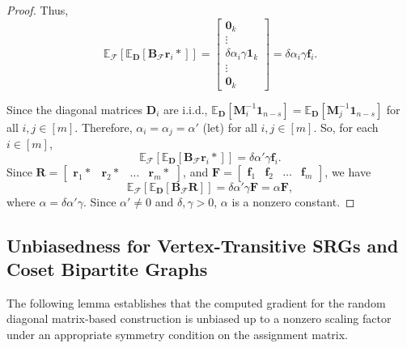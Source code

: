 \documentclass[journal,draftcls,onecolumn]{IEEEtran}
\theoremstyle{mystyle}
\newcommand{\bfD}{\mathbf{D}}
\newcommand{\bfF}{\mathbf{F}}
\newcommand{\bfA}{\mathbf{A}}
\newcommand{\bfR}{\mathbf{R}}
\newcommand{\cF}{\mathcal{F}}
\newcommand{\sifat}[1]{\marginpar{+}{\bf Sifat's remark}: {\em #1}}
\begin{document}
\begin{proof}
Thus,
\[ 
\mathbb{E}_{\mathcal{F}}[\mathbb{E}_{\mathbf{D}}\left[\mathbf{B}_{\mathcal{F}}\mathbf{r}_i*\right]] = \begin{bmatrix} \mathbf{0}_k\\ \vdots \\  \delta \alpha_i \gamma \mathbf{1}_{k} \\ \vdots\\ \mathbf{0}_k \end{bmatrix} =  \delta \alpha_i \gamma  \mathbf{f}_i
.\]

Since the diagonal matrices $\mathbf{D}_i$ are i.i.d., $\mathbb{E}_{\bfD}[\mathbf{M}_i^{-1} \mathbf{1}_{n-s}] = \mathbb{E}_{\bfD}[\mathbf{M}_j^{-1} \mathbf{1}_{n-s}]$ for all $i,j \in [m]$. Therefore, $\alpha_i = \alpha_ j = \alpha'$ (let) for all $i ,j \in [m]$. So, for each $i \in [m]$,  
\[ 
\mathbb{E}_{\mathcal{F}}[\mathbb{E}_{\mathbf{D}}\left[\mathbf{B}_{\mathcal{F}}\mathbf{r}_i*\right]]=  \delta \alpha' \gamma \mathbf{f}_i
.\]
Since $\bfR = \begin{bmatrix}\mathbf{r}_1* & \mathbf{r}_2* & \dots & \mathbf{r}_m* \end{bmatrix}$, and $\bfF = \begin{bmatrix}\mathbf{f}_1 & \mathbf{f}_2 & \dots & \mathbf{f}_m \end{bmatrix}$, we have 
\[ \mathbb{E}_{\mathcal{F}}[\mathbb{E}_{\mathbf{D}}\left[\mathbf{B}_{\mathcal{F}}\mathbf{R}\right]] = \delta \alpha' \gamma \mathbf{F} = \alpha \mathbf{F},\] 
where $\alpha = \delta \alpha' \gamma $. Since $\alpha' \ne 0$ and $\delta, \gamma > 0$, $\alpha$ is a nonzero constant.

\end{proof}
\subsection{Unbiasedness for Vertex-Transitive SRGs and Coset Bipartite Graphs}

The following lemma establishes that the computed gradient for the random diagonal matrix-based construction is unbiased up to a nonzero scaling factor under an appropriate symmetry condition on the assignment matrix.
\end{document}
